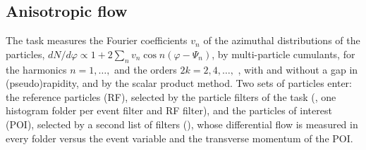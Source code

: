 \subsection{Anisotropic flow}
\label{sec:flow}

The task  measures the Fourier coefficients $v_n$ of the azimuthal distributions of the
particles, $dN/d\varphi \propto 1 + 2\sum_n v_n\cos n(\varphi-\Psi_n)$, by multi-particle cumulants, for the harmonics
$n = 1,\dots,$  and the orders $2k = 2, 4, \dots,$ , with and without a gap in
(pseudo)rapidity, and by the scalar product method. Two sets of particles enter: the reference particles (RF), selected
by the particle filters of the task (, one histogram folder per event filter and RF filter), and
the particles of interest (POI), selected by a second list of filters (), whose differential flow is
measured in every folder versus the event variable and the transverse momentum of the POI.

